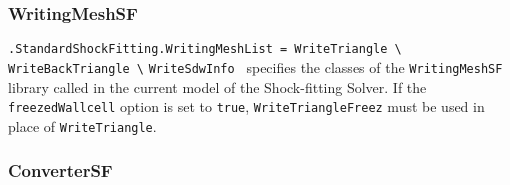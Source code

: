 \documentclass[11pt,a4paper,oneside]{article}
\begin{document}
\subsubsection*{WritingMeshSF}

\hspace*{1cm} \texttt{.StandardShockFitting.WritingMeshList = WriteTriangle \textbackslash{}}
\newline
\hspace*{9cm} \texttt{WriteBackTriangle \textbackslash{}}
\newline
\hspace*{9cm} \texttt{WriteSdwInfo }
\newline
\newline
specifies the classes of the \texttt{WritingMeshSF} library called in the current model of the Shock-fitting Solver.
\newline
If the \texttt{freezedWallcell} option is set to \texttt{true}, \texttt{WriteTriangleFreez} must be used in place of \texttt{WriteTriangle}.

\subsubsection*{ConverterSF}
\end{document}
